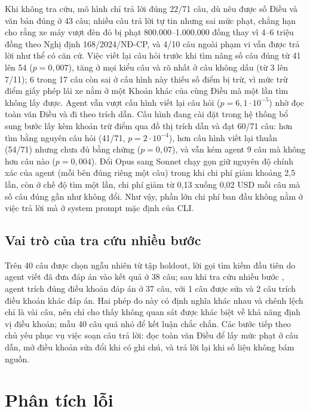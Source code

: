 Khi không tra cứu, mô hình chỉ trả lời đúng 22/71 câu, dù nêu được số Điều và văn bản đúng ở 43 câu; nhiều câu trả lời tự tin nhưng sai mức phạt, chẳng hạn cho rằng xe máy vượt đèn đỏ bị phạt 800.000--1.000.000 đồng thay vì 4--6 triệu đồng theo Nghị định 168/2024/NĐ-CP, và 4/10 câu ngoài phạm vi vẫn được trả lời như thể có căn cứ. Việc viết lại câu hỏi trước khi tìm nâng số câu đúng từ 41 lên 54 ($p = 0{,}007$), tăng ở mọi kiểu câu và rõ nhất ở câu không dấu (từ 3 lên 7/11); 6 trong 17 câu còn sai ở cấu hình này thiếu số điểm bị trừ, vì mức trừ điểm giấy phép lái xe nằm ở một Khoản khác của cùng Điều mà một lần tìm không lấy được. Agent vẫn vượt cấu hình viết lại câu hỏi ($p = 6{,}1\cdot10^{-5}$) nhờ đọc toàn văn Điều và đi theo trích dẫn. Cấu hình đang cài đặt trong hệ thống bổ sung bước lấy kèm khoản trừ điểm qua đồ thị trích dẫn và đạt 60/71 câu: hơn tìm bằng nguyên câu hỏi (41/71, $p = 2\cdot10^{-4}$), hơn cấu hình viết lại thuần (54/71) nhưng chưa đủ bằng chứng ($p = 0{,}07$), và vẫn kém agent 9 câu mà không hơn câu nào ($p = 0{,}004$). Đổi Opus sang Sonnet chạy gọn giữ nguyên độ chính xác của agent (mỗi bên đúng riêng một câu) trong khi chi phí giảm khoảng 2,5 lần, còn ở chế độ tìm một lần, chi phí giảm từ 0,13 xuống 0,02 USD mỗi câu mà số câu đúng gần như không đổi. Như vậy, phần lớn chi phí ban đầu không nằm ở việc trả lời mà ở system prompt mặc định của CLI.

\subsection{Vai trò của tra cứu nhiều bước}

Trên 40 câu được chọn ngẫu nhiên từ tập holdout, lời gọi tìm kiếm đầu tiên do agent viết đã đưa đáp án vào kết quả ở 38 câu; sau khi tra cứu nhiều bước \cite{yao2023react}, agent trích đúng điều khoản đáp án ở 37 câu, với 1 câu được sửa và 2 câu trích điều khoản khác đáp án. Hai phép đo này có định nghĩa khác nhau và chênh lệch chỉ là vài câu, nên chỉ cho thấy không quan sát được khác biệt về khả năng định vị điều khoản; mẫu 40 câu quá nhỏ để kết luận chắc chắn. Các bước tiếp theo chủ yếu phục vụ việc soạn câu trả lời: đọc toàn văn Điều để lấy mức phạt ở câu dẫn, mở điều khoản sửa đổi khi có ghi chú, và trả lời lại khi số liệu không bám nguồn.

\section{Phân tích lỗi}
\label{sec:ch5-phan-tich-loi}

